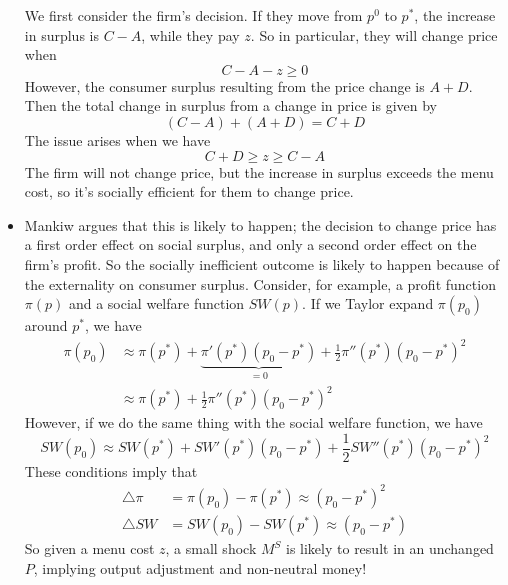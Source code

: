 \documentclass[12pt]{article}
\begin{document}
\begin{itemize}
\begin{center}
    \end{center}
    We first consider the firm's decision. If they move from $p^0$ to $p^*$, the increase in surplus is $C-A$, while they pay $z$. So in particular, they will change price when 
    \[C-A-z \geq 0\]
    However, the consumer surplus resulting from the price change is $A+D$. Then the total change in surplus from a change in price is given by
    \[(C-A) + (A+D) = C+D\]
    The issue arises when we have
    \[C+D \geq z \geq C-A\]
    The firm will not change price, but the increase in surplus exceeds the menu cost, so it's socially efficient for them to change price.
    \item Mankiw argues that this is likely to happen; the decision to change price has a first order effect on social surplus, and only a second order effect on the firm's profit. So the socially inefficient outcome is likely to happen because of the externality on consumer surplus. Consider, for example, a profit function $\pi(p)$ and a social welfare function $SW(p)$. If we Taylor expand $\pi(p_0)$ around $p^*$, we have
    \[\begin{split}
        \pi(p_0) &\approx \pi(p^*) + \underbrace{\pi'(p^*)(p_0 - p^*)}_{=0} + \frac{1}{2}\pi''(p^*)(p_0 - p^*)^2 \\
        &\approx \pi(p^*) + \frac{1}{2}\pi''(p^*)(p_0 - p^*)^2
    \end{split}\]
    However, if we do the same thing with the social welfare function, we have
    \[SW(p_0) \approx SW(p^*) + SW'(p^*)(p_0 - p^*) + \frac{1}{2}SW''(p^*)(p_0 - p^*)^2\]
    These conditions imply that
    \[\begin{split}
        \triangle \pi &= \pi(p_0) - \pi(p^*) \approx (p_0 - p^*)^2 \\
        \triangle SW &= SW(p_0) - SW(p^*) \approx (p_0 - p^*)
    \end{split}\]
    So given a menu cost $z$, a small shock $M^S$ is likely to result in an unchanged $P$, implying output adjustment and non-neutral money!
\end{itemize}
\end{document}
